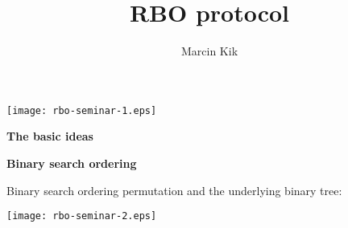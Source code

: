 \documentclass{letter}
\newcommand{\section}[1]{\medskip\bigskip

\noindent\textbf{\LARGE #1}}
\newcommand{\subsection}[1]{\medskip\bigskip

\noindent\textbf{\Large #1}}
\begin{document}
\title{\title{RBO protocol}\author{Marcin Kik}\maketitle}\author{}\maketitle

\texttt{[image: rbo-seminar-1.eps]}

\section{The basic ideas}

\subsection{Binary search ordering}

Binary search ordering permutation and the underlying binary tree:

\texttt{[image: rbo-seminar-2.eps]}
\end{document}
